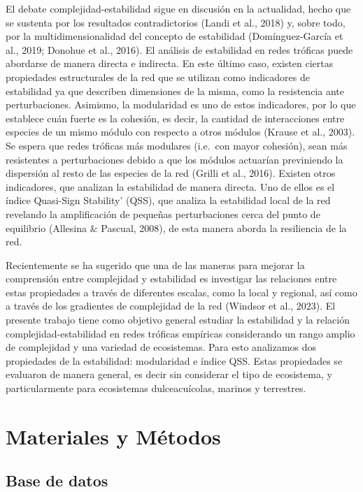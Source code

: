 \documentclass[
]{article}
\begin{document}
El debate complejidad-estabilidad sigue en discusión en la actualidad,
hecho que se sustenta por los resultados contradictorios (Landi et al.,
2018) y, sobre todo, por la multidimensionalidad del concepto de
estabilidad (Domínguez-García et al., 2019; Donohue et al., 2016). El
análisis de estabilidad en redes tróficas puede abordarse de manera
directa e indirecta. En este último caso, existen ciertas propiedades
estructurales de la red que se utilizan como indicadores de estabilidad
ya que describen dimensiones de la misma, como la resistencia ante
perturbaciones. Asimismo, la modularidad es uno de estos indicadores,
por lo que establece cuán fuerte es la cohesión, es decir, la cantidad
de interacciones entre especies de un mismo módulo con respecto a otros
módulos (Krause et al., 2003). Se espera que redes tróficas más
modulares (i.e.~con mayor cohesión), sean más resistentes a
perturbaciones debido a que los módulos actuarían previniendo la
dispersión al resto de las especies de la red (Grilli et al., 2016).
Existen otros indicadores, que analizan la estabilidad de manera
directa. Uno de ellos es el índice Quasi-Sign Stability' (QSS), que
analiza la estabilidad local de la red revelando la amplificación de
pequeñas perturbaciones cerca del punto de equilibrio (Allesina \&
Pascual, 2008), de esta manera aborda la resiliencia de la red.

Recientemente se ha sugerido que una de las maneras para mejorar la
comprensión entre complejidad y estabilidad es investigar las relaciones
entre estas propiedades a través de diferentes escalas, como la local y
regional, así como a través de los gradientes de complejidad de la red
(Windsor et al., 2023). El presente trabajo tiene como objetivo general
estudiar la estabilidad y la relación complejidad-estabilidad en redes
tróficas empíricas considerando un rango amplio de complejidad y una
variedad de ecosistemas. Para esto analizamos dos propiedades de la
estabilidad: modularidad e índice QSS. Estas propiedades se evaluaron de
manera general, es decir sin considerar el tipo de ecosistema, y
particularmente para ecosistemas dulceacuícolas, marinos y terrestres.

\hypertarget{materiales-y-muxe9todos}{%
\section{Materiales y Métodos}\label{materiales-y-muxe9todos}}

\hypertarget{base-de-datos}{%
\subsection{Base de datos}\label{base-de-datos}}
\end{document}
